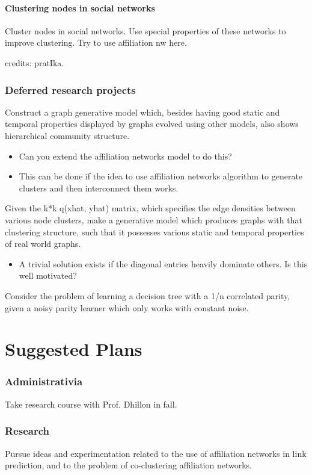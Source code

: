 \documentclass{article}
\begin{document}
\subsection{Clustering nodes in social networks}
Cluster nodes in social networks. Use special properties of these networks to improve clustering. Try to use affiliation nw here.

credits: pratIka.

\section{Deferred research projects}
Construct a graph generative model which, besides having good static and temporal properties displayed by graphs evolved using other models, also shows hierarchical community structure.

\begin{itemize}
\item Can you extend the affiliation networks model to do this?
\item This can be done if the idea to use affiliation networks algorithm to generate clusters and then interconnect them works.
\end{itemize}

Given the k*k q(xhat, yhat) matrix, which specifies the edge densities between various node clusters, make a generative model which produces graphs with that clustering structure, such that it possesses various static and temporal properties of real world graphs.

\begin{itemize}
\item A trivial solution exists if the diagonal entries heavily dominate others. Is this well motivated?
\end{itemize}

Consider the problem of learning a decision tree with a 1/n correlated parity, given a noisy parity learner which only works with constant noise.

\part{Suggested Plans}
\section{Administrativia}
Take research course with Prof. Dhillon in fall.

\section{Research}
Pursue ideas and experimentation related to the use of affiliation networks in link prediction, and to the problem of co-clustering affiliation networks.
\end{document}
